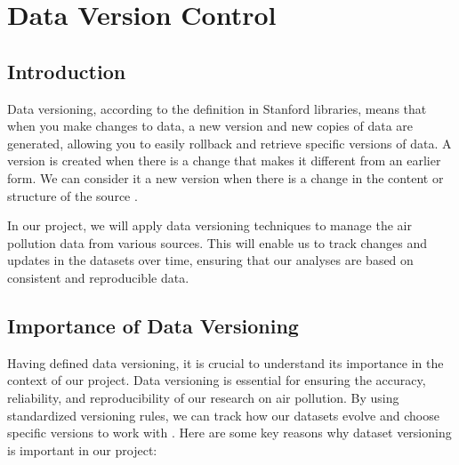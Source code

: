 %
%
%

\chapter{Data Version Control}
\section{Introduction}
Data versioning, according to the definition in Stanford libraries, means that
when you make changes to data, a new version and new copies of data are generated,
allowing you to easily rollback and retrieve specific versions of data. A version
is created when there is a change that makes it different from an earlier form.
We can consider it a new version when there is a change in the content or
structure of the source \cite{Zhao:2020}.

In our project, we will apply data versioning techniques to manage the air pollution
data from various sources. This will enable us to track changes and updates in
the datasets over time, ensuring that our analyses are based on consistent and reproducible
data.

\section{Importance of Data Versioning}
Having defined data versioning, it is crucial to understand its importance in
the context of our project. Data versioning is essential for ensuring the accuracy,
reliability, and reproducibility of our research on air pollution. By using
standardized versioning rules, we can track how our datasets evolve and choose specific
versions to work with \cite{Zhao:2020}. Here are some key reasons why dataset
versioning is important in our project:

